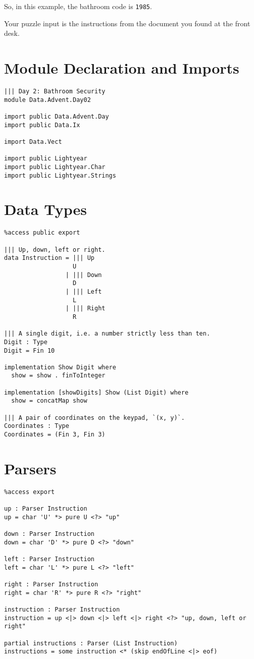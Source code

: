 So, in this example, the bathroom code is \texttt{1985}.

Your puzzle input is the instructions from the document you found at the
front desk.

\section{Module Declaration and
Imports}\label{module-declaration-and-imports}

\begin{verbatim}
||| Day 2: Bathroom Security
module Data.Advent.Day02

import public Data.Advent.Day
import public Data.Ix

import Data.Vect

import public Lightyear
import public Lightyear.Char
import public Lightyear.Strings
\end{verbatim}

\section{Data Types}\label{data-types}

\begin{verbatim}
%access public export

||| Up, down, left or right.
data Instruction = ||| Up
                   U
                 | ||| Down
                   D
                 | ||| Left
                   L
                 | ||| Right
                   R

||| A single digit, i.e. a number strictly less than ten.
Digit : Type
Digit = Fin 10

implementation Show Digit where
  show = show . finToInteger

implementation [showDigits] Show (List Digit) where
  show = concatMap show

||| A pair of coordinates on the keypad, `(x, y)`.
Coordinates : Type
Coordinates = (Fin 3, Fin 3)
\end{verbatim}

\newpage

\section{Parsers}\label{parsers}

\begin{verbatim}
%access export

up : Parser Instruction
up = char 'U' *> pure U <?> "up"

down : Parser Instruction
down = char 'D' *> pure D <?> "down"

left : Parser Instruction
left = char 'L' *> pure L <?> "left"

right : Parser Instruction
right = char 'R' *> pure R <?> "right"

instruction : Parser Instruction
instruction = up <|> down <|> left <|> right <?> "up, down, left or right"

partial instructions : Parser (List Instruction)
instructions = some instruction <* (skip endOfLine <|> eof)
\end{verbatim}

